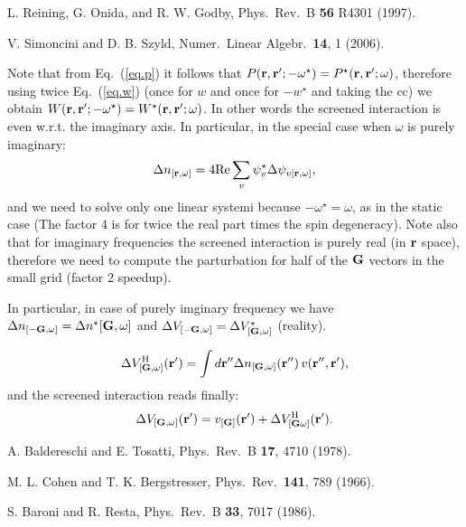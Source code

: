 \documentclass[twocolumn,prb,showpacs,superscriptaddress]{revtex4}
\def\w{\omega}
\def\G{{\bf G}}
\def\r{{\bf r}}
\def\rp{{\bf r^\prime}}
\def\rpp{{\bf r^{\prime\prime}}}
\begin{document}
\begin{thebibliography}{99}
L. Reining, G. Onida, and R. W. Godby, 
Phys.\ Rev.\ B {\bf 56} R4301 (1997).

V. Simoncini and D. B. Szyld,
Numer.\ Linear Algebr.\ {\bf 14}, 1 (2006).

Note that from Eq.\ (\ref{eq.p}) it follows that $P(\r,\rp;-\w^\star)=P^\star(\r,\rp;\w)$,
therefore using twice Eq.\ (\ref{eq.w}) (once for $w$ and once for $-w^\star$ and taking
the cc) we obtain $W(\r,\rp;-\w^\star)=W^\star(\r,\rp;\w)$. In other words
the screened interaction is even w.r.t. the imaginary axis.
In particular, in the special case when $\w$ is purely imaginary:
  \begin{equation}
  \Delta n_{[\r,\w]} = 4 {\rm Re} \sum_v \psi_v^\star \Delta \psi_{v[\r,\w]},
  \end{equation}
and we need to solve only one linear systemi because $-\w^\star=\w$,
as in the static case (The factor 4 is for twice the real part times the spin degeneracy).
Note also that for imaginary frequencies the screened interaction is purely real
(in $\r$ space), therefore we need to compute the parturbation for half of the $\G$ vectors in
the small grid (factor 2 speedup).

In particular, in case of purely imginary frequency we have 
$\Delta n_{[-\G,\w]}=\Delta n^\star{[\G,\w]}$ and $\Delta V_{[-\G,\w]}=\Delta V^\star_{[\G,\w]}$
(reality).

  \begin{equation}
  \Delta V^{\rm H}_{[\G,\w]}(\rp) = \int d\rpp \Delta n_{[\G,\w]}(\rpp) \, v(\rpp,\rp),
  \end{equation}
and the screened interaction reads finally:
  \begin{equation}
  \Delta V_{[\G,\w]}(\rp) = v_{[\G]}(\rp) + \Delta V^{\rm H}_{[\G\w]}(\rp).
  \end{equation}

A. Baldereschi and E. Tosatti,
Phys.\ Rev.\ B {\bf 17}, 4710 (1978).

M. L. Cohen and T. K. Bergstresser,
Phys.\ Rev.\ {\bf 141}, 789 (1966).

S. Baroni and R. Resta,
Phys.\ Rev.\ B {\bf 33}, 7017 (1986).

\end{thebibliography}
\end{document}
